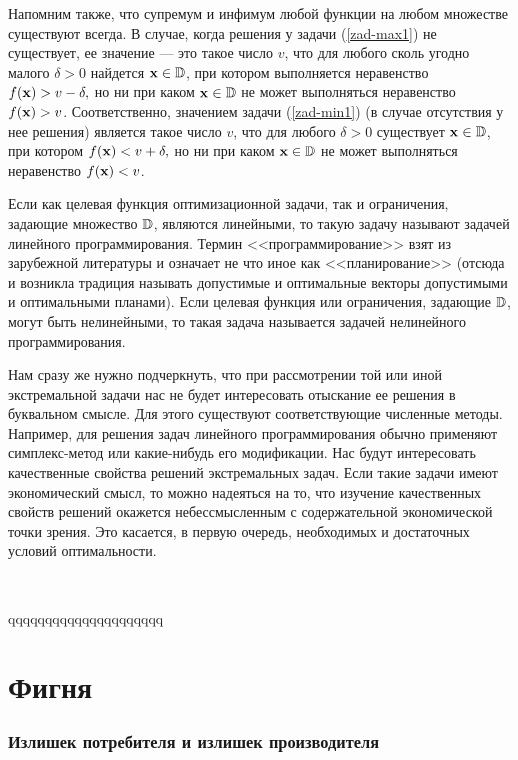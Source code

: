     Напомним также, что супремум и инфимум любой функции на любом
    множестве существуют всегда. В случае, когда решения у задачи (\ref{zad-max1}) не
    существует, ее значение  --- это такое
    число $v$, что для любого сколь угодно малого $\delta>0$
    найдется $\mathbf{x}\in\mathbb{D}$, при котором выполняется неравенство
    $f(\mathbf{x})>v-\delta,$
    но ни при каком $\mathbf{x}\in\mathbb{D}$ не может выполняться
    неравенство $f(\mathbf{x})>v$. Соответственно, значением задачи
    (\ref{zad-min1}) (в случае отсутствия у нее решения)
    является такое число $v$, что для любого $\delta>0$
    существует $\mathbf{x}\in\mathbb{D}$, при котором
    $f(\mathbf{x})<v+\delta,$
    но ни при каком $\mathbf{x}\in\mathbb{D}$ не может выполняться
    неравенство $f(\mathbf{x})<v$.




    Если как целевая функция оптимизационной задачи, так и
    ограничения, задающие множество $\mathbb{D}$, являются линейными, то
    такую задачу называют задачей линейного программирования. Термин
    <<программирование>> взят из зарубежной литературы и означает не
    что иное как <<планирование>> (отсюда и возникла традиция называть
    допустимые и оптимальные векторы допустимыми и оптимальными
    планами). Если целевая функция или
    ограничения, задающие  $\mathbb{D}$, могут быть нелинейными, то
    такая задача называется задачей нелинейного программирования.


    Нам сразу же нужно подчеркнуть, что при рассмотрении той или
    иной экстремальной задачи нас не будет интересовать
    отыскание ее решения в буквальном смысле. Для этого существуют
    соответствующие численные методы. Например, для решения задач
    линейного программирования обычно применяют симплекс-метод или
    какие-нибудь его модификации. Нас будут интересовать
    качественные свойства решений экстремальных задач. Если такие
    задачи имеют  экономический смысл, то можно надеяться на то, что
    изучение качественных свойств решений окажется небессмысленным с
    содержательной экономической точки зрения. Это касается, в
    первую очередь, необходимых и достаточных условий оптимальности.


\


  qqqqqqqqqqqqqqqqqqqqq



\chapter{Фигня}


    \subsection{Излишек потребителя и излишек производителя}

